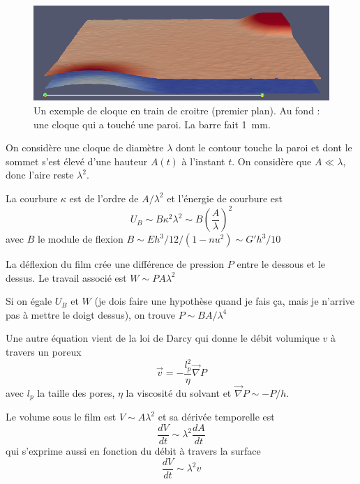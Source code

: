 \documentclass[12pt,a4paper]{article}
\author{Mathieu Leocmach}
\begin{document}
\begin{figure}
\includegraphics[width=\textwidth]{plots_0117.png}
\caption{Un exemple de cloque en train de croitre (premier plan). Au fond : une cloque qui a touché une paroi. La barre fait \SI{1}{\milli\metre}.}
\end{figure}

On considère une cloque de diamètre $\lambda$ dont le contour touche la paroi et dont le sommet s'est élevé d'une hauteur $A(t)$ à l'instant $t$. On considère que $A \ll \lambda$, donc l'aire reste $\lambda^2$.

La courbure $\kappa$ est de l'ordre de $A/\lambda^2$ et l'énergie de courbure est
\begin{equation}
U_B \sim B  \kappa^2  \lambda^2 \sim B  \left(\frac{A}{\lambda}\right)^2
\end{equation}
avec $B$ le module de flexion $B \sim E h^3 /12 / (1-nu^2) \sim G' h^3/10$

La déflexion du film crée une différence de pression $P$ entre le dessous et le dessus. Le travail associé est $W \sim P  A  \lambda^2$

Si on égale $U_B$ et $W$ (je dois faire une hypothèse quand je fais ça, mais je n'arrive pas à mettre le doigt dessus), on trouve $P \sim BA/\lambda^4$

Une autre équation vient de la loi de Darcy qui donne le débit volumique $v$ à travers un poreux 
\begin{equation}
\vec{v} = - \frac{l_p^2}{\eta}  \vec{\nabla} P
\label{eq:Darcy}
\end{equation}
avec $l_p$ la taille des pores, $\eta$ la viscosité du solvant et $\vec{\nabla} P \sim -P/h$.

Le volume sous le film est $V \sim A \lambda^2$ et sa dérivée temporelle est
\begin{equation}
\frac{dV}{dt} \sim \lambda^2  \frac{dA}{dt}
\label{eq:var_vol}
\end{equation}
qui s'exprime aussi en fonction du débit à travers la surface
\begin{equation}
\frac{dV}{dt} \sim \lambda^2  v
\label{eq:debit}
\end{equation}
\end{document}
